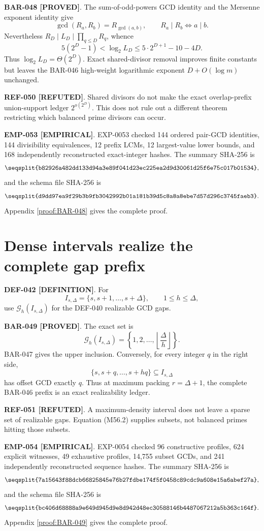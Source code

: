 \documentclass[11pt]{article}
\newcommand{\claimstatus}[2]{\textbf{#1 [#2]}}
\begin{document}
\claimstatus{BAR-048}{PROVED}. The sum-of-odd-powers GCD identity and the
Mersenne exponent identity give
\[
\gcd(R_a,R_b)=R_{\gcd(a,b)},
\qquad
R_a\mid R_b\Longleftrightarrow a\mid b.
\tag{M55.2}
\]
Nevertheless \(R_D\mid L_D\mid\prod_{q\le D}R_q\), whence
\[
5(2^D-1)<\log_2L_D
\le5\cdot2^{D+1}-10-4D.
\tag{M55.3}
\]
Thus \(\log_2L_D=\Theta(2^D)\). Exact shared-divisor removal improves
finite constants but leaves the BAR-046 high-weight logarithmic exponent
\(D+O(\log m)\) unchanged.

\claimstatus{REF-050}{REFUTED}. Shared divisors do not make the exact
overlap-prefix union-support ledger \(2^{o(2^D)}\). This does not rule out
a different theorem restricting which balanced prime divisors can occur.

\claimstatus{EMP-053}{EMPIRICAL}. EXP-0053 checked 144 ordered pair-GCD
identities, 144 divisibility equivalences, 12 prefix LCMs, 12 largest-value
lower bounds, and 168 independently reconstructed exact-integer hashes. The
summary SHA-256 is
\[
\texttt{\seqsplit{b82926a482dd133d94a3e89f041d23ec225ea2d9d30061d25f6e75c017b01534}},
\]
and the schema file SHA-256 is
\[
\texttt{\seqsplit{d9dd97ea9f29b3b9fb3042992b01a181b39d5c8a8a8ebe7d57d296c3745faeb3}}.
\]
Appendix \ref{proof:BAR-048} gives the complete proof.

\section{Dense intervals realize the complete gap prefix}

\claimstatus{DEF-042}{DEFINITION}. For
\[
I_{s,\Delta}=\{s,s+1,\ldots,s+\Delta\},
\qquad 1\le h\le\Delta,
\tag{M56.1}
\]
use \(\mathcal G_h(I_{s,\Delta})\) for the DEF-040 realizable GCD gaps.

\claimstatus{BAR-049}{PROVED}. The exact set is
\[
\mathcal G_h(I_{s,\Delta})
=\left\{1,2,\ldots,
\left\lfloor\frac{\Delta}{h}\right\rfloor\right\}.
\tag{M56.2}
\]
BAR-047 gives the upper inclusion. Conversely, for every integer \(q\) in
the right side,
\[
\{s,s+q,\ldots,s+hq\}\subseteq I_{s,\Delta}
\tag{M56.3}
\]
has offset GCD exactly \(q\). Thus at maximum packing
\(r=\Delta+1\), the complete BAR-046 prefix is an exact realizability
ledger.

\claimstatus{REF-051}{REFUTED}. A maximum-density interval does not leave a
sparse set of realizable gaps. Equation (M56.2) supplies subsets, not
balanced primes hitting those subsets.

\claimstatus{EMP-054}{EMPIRICAL}. EXP-0054 checked 96 constructive profiles,
624 explicit witnesses, 49 exhaustive profiles, 14,755 subset GCDs, and 241
independently reconstructed sequence hashes. The summary SHA-256 is
\[
\texttt{\seqsplit{7a15643f88dcb66825845e76b27fdbe174f5f0458c89cdc9a608e15a6abef27a}},
\]
and the schema file SHA-256 is
\[
\texttt{\seqsplit{bc406d68888a9e649d945d9e8d942d48ec30588146b4487067212a5b363c164f}}.
\]
Appendix \ref{proof:BAR-049} gives the complete proof.
\end{document}
